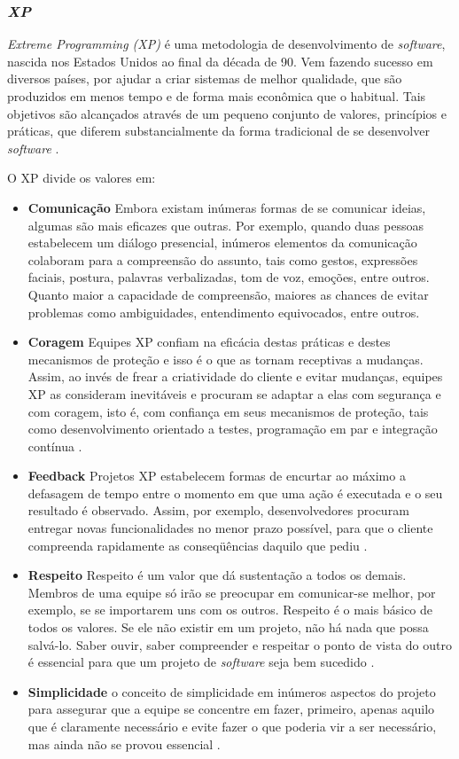 \documentclass{acm_proc_article-sp}
\begin{document}
\subsubsection{\textit{XP}}
\textit{Extreme Programming (XP)} é uma metodologia de desenvolvimento de \textit{software}, nascida nos Estados Unidos ao final da década de 90. Vem fazendo sucesso em diversos países, por ajudar a criar sistemas de melhor qualidade, que são produzidos em menos tempo e de forma mais econômica que o habitual. Tais objetivos são alcançados através de um pequeno conjunto de valores, princípios e práticas, que diferem substancialmente da forma tradicional de se desenvolver \textit{software} \cite{xp:agil}.

O XP divide os valores em:

\begin{itemize}
\item \textbf{Comunicação} Embora existam inúmeras formas de se comunicar ideias, algumas são mais eficazes que outras. Por exemplo, quando duas pessoas estabelecem um diálogo presencial, inúmeros elementos da comunicação colaboram para a compreensão do assunto, tais como gestos, expressões faciais, postura, palavras verbalizadas, tom de voz, emoções, entre outros. Quanto maior a capacidade de compreensão, maiores as chances de evitar problemas como ambiguidades, entendimento equivocados, entre outros\cite{xp:agil}.
\item \textbf{Coragem} Equipes XP confiam na eficácia destas práticas e destes mecanismos de proteção e isso é o que as tornam receptivas a mudanças. Assim, ao invés de frear a criatividade do cliente e evitar mudanças, equipes XP as consideram inevitáveis e procuram se adaptar a elas com segurança e com coragem, isto é, com confiança em seus mecanismos de proteção, tais como desenvolvimento orientado a testes, programação em par e integração contínua \cite{xp:agil}.
\item \textbf{Feedback} Projetos XP estabelecem formas de encurtar ao máximo a defasagem de tempo entre o momento em que uma ação é executada e o seu resultado é observado. Assim, por exemplo, desenvolvedores procuram entregar novas funcionalidades no menor prazo possível, para que o cliente compreenda rapidamente as conseqüências daquilo que pediu \cite{xp:agil}.
\item \textbf{Respeito} Respeito é um valor que dá sustentação a todos os demais. Membros de uma equipe só irão se preocupar em comunicar-se melhor, por exemplo, se se importarem uns com os outros. Respeito é o mais básico de todos os valores. Se ele não existir em um projeto, não há nada que possa salvá-lo. Saber ouvir, saber compreender e respeitar o ponto de vista do outro é essencial para que um projeto de \textit{software} seja bem sucedido \cite{xp:agil}.
\item \textbf{Simplicidade} o conceito de simplicidade em inúmeros aspectos do projeto para assegurar que a equipe se concentre em fazer, primeiro, apenas aquilo que é claramente necessário e evite fazer o que poderia vir a ser necessário, mas ainda não se provou essencial \cite{xp:agil}.
\end{itemize}
\end{document}
